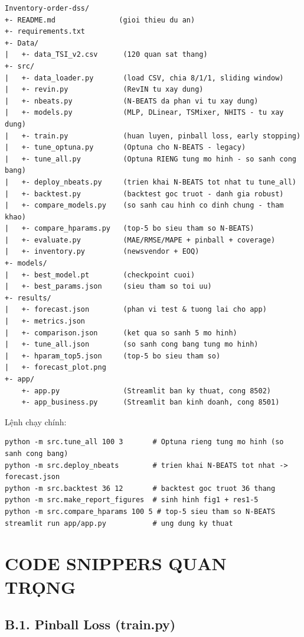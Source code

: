 \documentclass[12pt, a4paper]{report}
\begin{document}
\begin{verbatim}
Inventory-order-dss/
+- README.md               (gioi thieu du an)
+- requirements.txt
+- Data/
|   +- data_TSI_v2.csv      (120 quan sat thang)
+- src/
|   +- data_loader.py       (load CSV, chia 8/1/1, sliding window)
|   +- revin.py             (RevIN tu xay dung)
|   +- nbeats.py            (N-BEATS da phan vi tu xay dung)
|   +- models.py            (MLP, DLinear, TSMixer, NHITS - tu xay dung)
|   +- train.py             (huan luyen, pinball loss, early stopping)
|   +- tune_optuna.py       (Optuna cho N-BEATS - legacy)
|   +- tune_all.py          (Optuna RIENG tung mo hinh - so sanh cong bang)
|   +- deploy_nbeats.py     (trien khai N-BEATS tot nhat tu tune_all)
|   +- backtest.py          (backtest goc truot - danh gia robust)
|   +- compare_models.py    (so sanh cau hinh co dinh chung - tham khao)
|   +- compare_hparams.py   (top-5 bo sieu tham so N-BEATS)
|   +- evaluate.py          (MAE/RMSE/MAPE + pinball + coverage)
|   +- inventory.py         (newsvendor + EOQ)
+- models/
|   +- best_model.pt        (checkpoint cuoi)
|   +- best_params.json     (sieu tham so toi uu)
+- results/
|   +- forecast.json        (phan vi test & tuong lai cho app)
|   +- metrics.json
|   +- comparison.json      (ket qua so sanh 5 mo hinh)
|   +- tune_all.json        (so sanh cong bang tung mo hinh)
|   +- hparam_top5.json     (top-5 bo sieu tham so)
|   +- forecast_plot.png
+- app/
    +- app.py               (Streamlit ban ky thuat, cong 8502)
    +- app_business.py      (Streamlit ban kinh doanh, cong 8501)
\end{verbatim}

Lệnh chạy chính:
\begin{verbatim}
python -m src.tune_all 100 3       # Optuna rieng tung mo hinh (so sanh cong bang)
python -m src.deploy_nbeats        # trien khai N-BEATS tot nhat -> forecast.json
python -m src.backtest 36 12       # backtest goc truot 36 thang
python -m src.make_report_figures  # sinh hinh fig1 + res1-5
python -m src.compare_hparams 100 5 # top-5 sieu tham so N-BEATS
streamlit run app/app.py           # ung dung ky thuat
\end{verbatim}

\chapter{CODE SNIPPERS QUAN TRỌNG}

\section*{B.1. Pinball Loss (train.py)}
\end{document}
